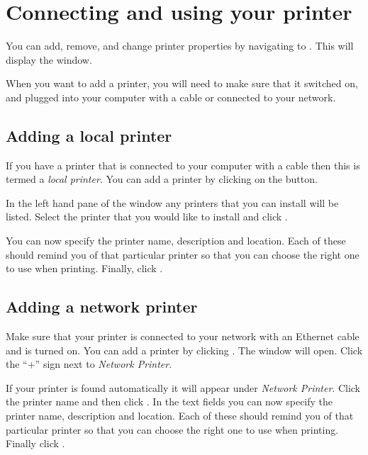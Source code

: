 
\section{Connecting and using your printer}

You can add, remove, and change printer properties by navigating to . 
This will display the  window.

When you want to add a printer, you will need to make sure that it switched on, and plugged into your computer with a  cable or connected to your network.

\subsection{Adding a local printer}

If you have a printer that is connected to your computer with a  cable then this
is termed a \emph{local printer}. You can add a printer by clicking on the  button.

In the left hand pane of the  window any printers that you can
install will be listed. Select the printer that you would like to install and click .

You can now specify the printer name, description and location. Each of these 
should remind you of that particular printer so that you can choose the right one
to use when printing. Finally, click .

\subsection{Adding a network printer}

Make sure that your printer is connected to your network with an Ethernet cable and is 
turned on. You can add a printer by clicking . The  window will open. Click
 the ``+'' sign next to \emph{Network Printer}. 

If your printer is found automatically it will appear under \emph{Network Printer}. 
Click the printer name and then click . In the text fields you
 can now specify the printer name, description and location. Each of these should remind you of 
that particular printer so that you can choose the right one to use when printing. Finally click .

